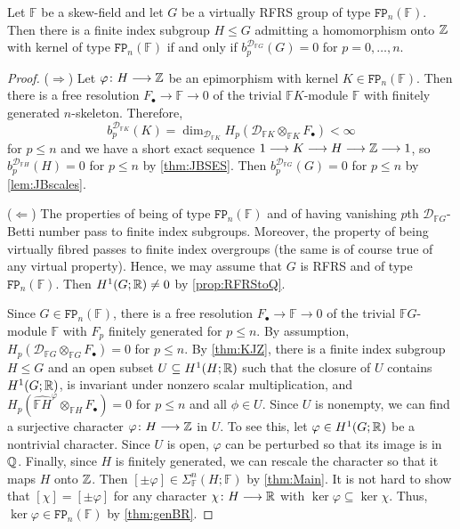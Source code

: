 \documentclass[11pt, letterpaper]{amsart}
\begin{document}
\begin{thm}\label{thm:agrarianMain}
Let $\mathbb{F}$ be a skew-field and let $G$ be a virtually RFRS group of type $\mathtt{FP}_n(\mathbb{F})$. Then there is a finite index subgroup $H \leqslant G$ admitting a homomorphism onto $\mathbb{Z}$ with kernel of type $\mathtt{FP}_n(\mathbb{F})$ if and only if $b_p^{\mathcal{D}_{\mathbb{F}G}}(G) = 0$ for $p = 0, \dots, n$.
\end{thm}
\begin{proof}
($\Longrightarrow$) Let $\varphi \colon H \longrightarrow \mathbb{Z}$ be an epimorphism with kernel $K \in \mathtt{FP}_n(\mathbb{F})$. Then there is a free resolution $F_\bullet \longrightarrow \mathbb{F} \longrightarrow 0$ of the trivial $\mathbb{F}K$-module $\mathbb{F}$ with finitely generated $n$-skeleton. Therefore, 
\[
    b_p^{\mathcal{D}_{\mathbb{F}K}}(K) = \dim_{\mathcal{D}_{\mathbb{F}K}} H_p (\mathcal{D}_{\mathbb{F}K} \otimes_{\mathbb{F}K} F_\bullet) < \infty
\]
for $p \leqslant n$ and we have a short exact sequence $1 \longrightarrow K \longrightarrow H \longrightarrow \mathbb{Z} \longrightarrow 1$, so $b_p^{\mathcal{D}_{\mathbb{F}H}}(H) = 0$ for $p \leqslant n$ by \cref{thm:JBSES}. Then $b_p^{\mathcal{D}_{\mathbb{F}G}}(G) = 0$ for $p \leqslant n$ by \cref{lem:JBscales}.

\smallskip

($\Longleftarrow$) The properties of being of type $\mathtt{FP}_n(\mathbb{F})$ and of having vanishing $p$th $\mathcal{D}_{\mathbb{F}G}$-Betti number pass to finite index subgroups. Moreover, the property of being virtually fibred passes to finite index overgroups (the same is of course true of any virtual property). Hence, we may assume that $G$ is RFRS and of type $\mathtt{FP}_n(\mathbb{F})$. Then $H^1(G; \mathbb{R}) \neq 0$ by \cref{prop:RFRStoQ}.

Since $G \in \mathtt{FP}_n(\mathbb{F})$, there is a free resolution $F_\bullet \longrightarrow \mathbb{F} \longrightarrow 0$ of the trivial $\mathbb{F}G$-module $\mathbb{F}$ with $F_p$ finitely generated for $p \leqslant n$. By assumption, $H_p(\mathcal{D}_{\mathbb{F}G} \otimes_{\mathbb{F}G} F_\bullet) = 0$ for $p \leqslant n$. By \cref{thm:KJZ}, there is a finite index subgroup $H \leqslant G$ and an open subset $U \subseteq H^1(H;\mathbb{R})$ such that the closure of $U$ contains $H^1(G;\mathbb{R})$, is invariant under nonzero scalar multiplication, and $H_p(\widehat{\mathbb{F}H}^\varphi \otimes_{\mathbb{F}H} F_\bullet) = 0$ for $p \leqslant n$ and all $\phi \in U$. Since $U$ is nonempty, we can find a surjective character $\varphi \colon H \longrightarrow \mathbb{Z}$ in $U$. To see this, let $\varphi \in H^1(G;\mathbb{R})$ be a nontrivial character. Since $U$ is open, $\varphi$ can be perturbed so that its image is in $\mathbb{Q}$. Finally, since $H$ is finitely generated, we can rescale the character so that it maps $H$ onto $\mathbb{Z}$.  Then $[\pm \varphi] \in \Sigma_\mathbb{F}^n(H;\mathbb{F})$ by \cref{thm:Main}. It is not hard to show that $[\chi] = [\pm \varphi]$ for any character $\chi \colon H \longrightarrow \mathbb{R}$ with $\ker \varphi \subseteq \ker \chi$. Thus, $\ker \varphi \in \mathtt{FP}_n(\mathbb{F})$ by \cref{thm:genBR}. \qedhere

\end{proof}
\end{document}

